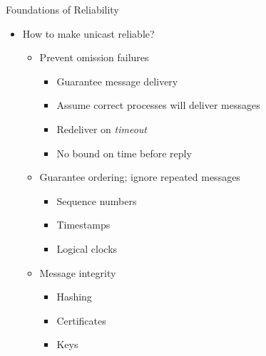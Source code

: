 \documentclass[pdftex]{beamer}
\begin{document}

\begin{frame}{Foundations of Reliability}

\begin{itemize}
	\item How to make unicast reliable?
	\begin{itemize}
	
		\item Prevent \alert{omission failures}
		\begin{itemize}
			 \item Guarantee message delivery
			 \item Assume correct processes will deliver messages
			 \item Redeliver on \emph{timeout}
			 \item No bound on time before reply
		\end{itemize}
		
		\item Guarantee ordering; ignore repeated messages
		\begin{itemize}
			 \item Sequence numbers
			 \item Timestamps
			 \item Logical clocks
		\end{itemize}

		\item Message integrity
		\begin{itemize}
			 \item Hashing
			 \item Certificates
			 \item Keys
		\end{itemize}
	\end{itemize}
\end{itemize}
\end{frame}
\end{document}
